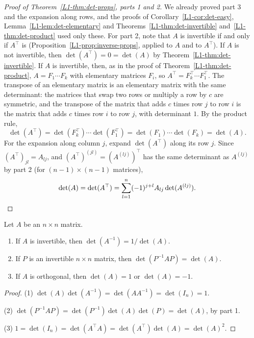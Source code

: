 \begin{proof}[Proof of Theorem~\ref{L1-thm:det-props}, parts 1 and 2]
    We already proved part 3 and the expansion along rows, and the proofs of Corollary~\ref{L1-cor:det-easy}, Lemma~\ref{L1-lem:det-elementary} and Theorems~\ref{L1-thm:det-invertible} and~\ref{L1-thm:det-product} used only these. For part 2, note that $A$ is invertible if and only if $A^\top$ is (Proposition~\ref{L1-prop:inverse-props}, applied to $A$ and to $A^\top$). If $A$ is not invertible, then $\det(A^\top) = 0 = \det(A)$ by Theorem~\ref{L1-thm:det-invertible}. If $A$ is invertible, then, as in the proof of Theorem~\ref{L1-thm:det-product}, $A = F_1 \cdots F_k$ with elementary matrices $F_i$, so $A^\top = F_k^\top \cdots F_1^\top$. The transpose of an elementary matrix is an elementary matrix with the same determinant: the matrices that swap two rows or multiply a row by $c$ are symmetric, and the transpose of the matrix that adds $c$ times row $j$ to row $i$ is the matrix that adds $c$ times row $i$ to row $j$, with determinant $1$. By the product rule,
    \[\det(A^\top) = \det(F_k^\top) \cdots \det(F_1^\top) = \det(F_1) \cdots \det(F_k) = \det(A).\]
    For the expansion along column $j$, expand $\det(A^\top)$ along its row $j$. Since $(A^\top)_{jl} = A_{lj}$, and $(A^\top)^{(jl)} = (A^{(lj)})^\top$ has the same determinant as $A^{(lj)}$ by part 2 (for $(n-1) \times (n-1)$ matrices),
    \[\det(A) = \det(A^\top) = \sum_{l=1}^n (-1)^{j+l} A_{lj}\det(A^{(lj)}). \qedhere\]
\end{proof}

\begin{corollary}\label{L1-cor:det-consequences}
    Let $A$ be an $n \times n$ matrix.
    \begin{enumerate}
        \item If $A$ is invertible, then $\det(A^{-1}) = 1/\det(A)$.
        \item If $P$ is an invertible $n \times n$ matrix, then $\det(P^{-1}AP) = \det(A)$.
        \item If $A$ is orthogonal, then $\det(A) = 1$ or $\det(A) = -1$.
    \end{enumerate}
\end{corollary}

\begin{proof}
    (1) $\det(A) \det(A^{-1}) = \det(AA^{-1}) = \det(I_n) = 1$.

    (2) $\det(P^{-1}AP) = \det(P^{-1}) \det(A) \det(P) = \det(A)$, by part 1.

    (3) $1 = \det(I_n) = \det(A^\top A) = \det(A^\top) \det(A) = \det(A)^2$.
\end{proof}

